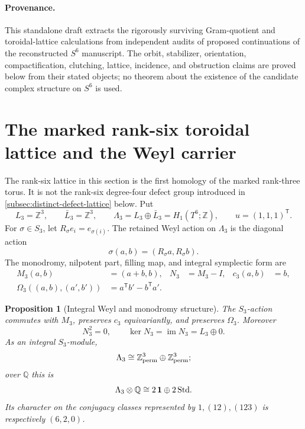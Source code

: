 \documentclass[11pt]{article}
\newtheorem{proposition}[theorem]{Proposition}
\theoremstyle{definition}
\theoremstyle{remark}
\numberwithin{equation}{section}
\begin{document}
\paragraph{Provenance.}
This standalone draft extracts the rigorously surviving Gram-quotient and
toroidal-lattice calculations from independent audits of proposed
continuations of the reconstructed \(S^6\) manuscript.  The orbit,
stabilizer, orientation, compactification, clutching, lattice, incidence, and
obstruction claims are proved below from their stated objects; no theorem
about the existence of the candidate complex structure on \(S^6\) is used.



\section{The marked rank-six toroidal lattice and the Weyl carrier}
\label{sec:rank-six-toroidal-lattice}

The rank-six lattice in this section is the first homology of the marked
rank-three torus.  It is not the rank-six degree-four defect group introduced
in \cref{subsec:distinct-defect-lattice} below.  Put
\[
 L_3=\mathbb Z^3,\qquad
 \bar L_3=\mathbb Z^3,\qquad
 \Lambda_3=L_3\oplus\bar L_3=H_1(T^6;\mathbb Z),
 \qquad u=(1,1,1)^{\mathsf T}.
\]
For \(\sigma\in S_3\), let \(R_\sigma e_i=e_{\sigma(i)}\).  The retained
Weyl action on \(\Lambda_3\) is the diagonal action
\begin{equation}
 \sigma(a,b)=(R_\sigma a,R_\sigma b).                    \label{eq:rank6-s3-action}
\end{equation}
The monodromy, nilpotent part, filling map, and integral symplectic form are
\begin{align}
 M_3(a,b)&=(a+b,b),& N_3&=M_3-I, & c_3(a,b)&=b,
                                                        \label{eq:rank6-monodromy}\\
 \Omega_3((a,b),(a',b'))&=a^{\mathsf T}b'-b^{\mathsf T}a'.
                                                        \label{eq:rank6-symplectic}
\end{align}

\begin{proposition}[Integral Weyl and monodromy structure]
\label{prop:rank6-weyl-monodromy}
The \(S_3\)-action commutes with \(M_3\), preserves \(c_3\) equivariantly,
and preserves \(\Omega_3\).  Moreover
\[
 N_3^2=0,\qquad
 \ker N_3=\operatorname{im}N_3=L_3\oplus0.
\]
As an integral \(S_3\)-module,
\[
 \Lambda_3\cong\mathbb Z^3_{\rm perm}\oplus
                    \mathbb Z^3_{\rm perm};
\]
over \(\mathbb Q\) this is
\begin{equation}
 \Lambda_3\otimes\mathbb Q
 \cong2\,\mathbf1\oplus2\,{\rm Std}.                  \label{eq:rank6-rational-decomposition}
\end{equation}
Its character on the conjugacy classes represented by
\(1,(12),(123)\) is respectively \((6,2,0)\).
\end{proposition}
\end{document}
